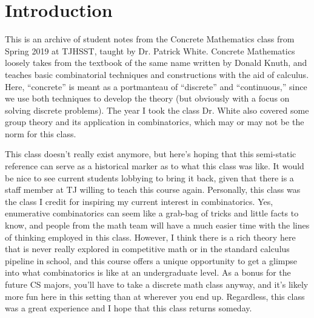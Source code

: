 \setcounter{section}{-1}
\section{Introduction}
This is an archive of student notes from the Concrete Mathematics class 
from Spring 2019 at TJHSST, taught by Dr. Patrick White. 
Concrete Mathematics loosely takes from the 
textbook of the same name written by Donald Knuth, and teaches basic
combinatorial techniques and constructions with the aid of calculus.
Here, ``concrete'' is meant as a portmanteau of ``discrete'' and
``continuous,'' since we use both techniques to develop the theory (but obviously
with a focus on solving discrete problems). 
The year I took the class Dr. White 
also covered some group theory and its application in combinatorics, which may
or may not be the norm for this class. 

This class doesn't really exist anymore, but here's hoping that this semi-static
reference can serve as a historical marker as to what this class was like. It 
would be nice to see current students lobbying to bring it back, given that there is
a staff member at TJ willing to teach this course again. Personally, this class 
was the class I credit for inspiring my current interest in combinatorics.
Yes, enumerative combinatorics can seem like a grab-bag of tricks and little facts 
to know, and people from the math team will have a much easier time with the lines 
of thinking employed in this class. However, I think there is a rich theory here
that is never really explored in competitive math or in the standard calculus
pipeline in school, and this course offers a unique
opportunity to get a glimpse into what combinatorics is like at an undergraduate
level. As a bonus for the future CS majors, you'll have to take a discrete math class
anyway, and it's likely more fun here in this setting than at wherever you end up. 
Regardless, this class was a great experience and I hope that this class returns someday. 

